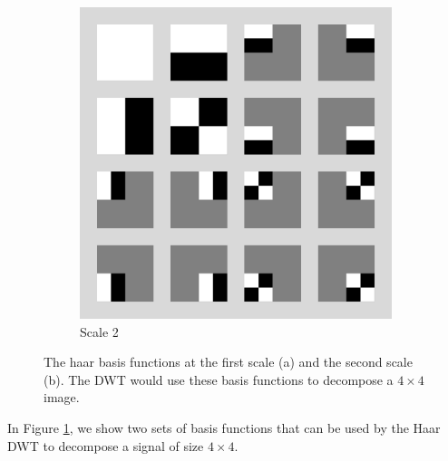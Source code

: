 \begin{figure}
\begin{subfigure}{0.4\textwidth}
  \includegraphics[width=\textwidth]{Chapter3/Images/haar2_scale2.png}
  \caption{Scale 2}
\end{subfigure}
\caption[2-D Haar basis functions]{The haar basis functions at the first scale (a) and the second scale (b). The DWT would use these basis functions to decompose a $4\times 4$ image.}
\label{fig:haar2_basis}
\end{figure}

In Figure \ref{fig:haar2_basis}, we show two sets of basis functions that can be used by the Haar DWT to decompose a signal of size $4\times 4$.


